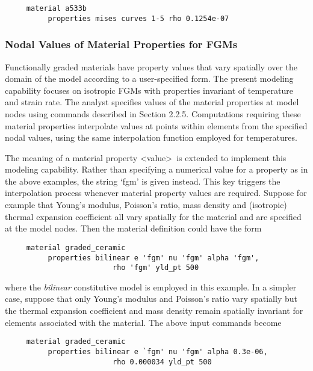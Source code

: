 \documentclass[11pt]{report}
\numberwithin{equation}{section}
\newcommand{\nin} {\noindent}
\newcommand{\ti}{\emph}
\begin{document}
\small
\begin{verbatim}
     material a533b
          properties mises curves 1-5 rho 0.1254e-07
\end{verbatim}
\normalsize

\subsubsection{Nodal Values of Material Properties for FGMs}
\nin Functionally graded materials have property values that vary spatially
over the domain of the model according to a user-specified form. The
present modeling capability focuses on isotropic FGMs with properties
invariant of temperature and strain rate. The analyst specifies values of the
material properties at model nodes using commands described in Section 2.2.5.
Computations requiring these material properties interpolate values at points
within elements from the specified nodal values, using the same interpolation
function employed for temperatures.

The meaning of a material property \textless value\textgreater\ is 
extended to implement this
modeling capability. Rather than specifying a numerical value for a property as
in the above examples, the string `fgm' is given instead. This key triggers the
interpolation process whenever material property values are required.
Suppose for example that Young's modulus, Poisson's ratio, mass
density and (isotropic) thermal expansion coefficient all vary spatially for the
material and are specified at the model nodes. Then the material definition
could have the form

\small
\begin{verbatim}
     material graded_ceramic
          properties bilinear e 'fgm' nu 'fgm' alpha 'fgm',
	                     rho 'fgm' yld_pt 500
\end{verbatim}
\normalsize

\nin where the \ti{bilinear} constitutive model is employed in this example. 
In a simpler case, suppose that only Young's modulus and Poisson's ratio vary
spatially but the thermal expansion coefficient and mass density remain
spatially invariant for elements associated with the material. The above input
commands become 

\small
\begin{verbatim}
     material graded_ceramic
          properties bilinear e `fgm' nu 'fgm' alpha 0.3e-06,
	                     rho 0.000034 yld_pt 500
\end{verbatim}
\normalsize
\end{document}
